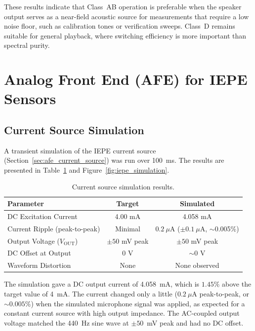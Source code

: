 These results indicate that Class~AB operation is preferable when the speaker output serves as a near-field acoustic source for measurements that require a low noise floor, such as calibration tones or verification sweeps. Class~D remains suitable for general playback, where switching efficiency is more important than spectral purity.


\section{Analog Front End (AFE) for IEPE Sensors}


\subsection{Current Source Simulation}
\label{sec:res_afe_current}
A transient simulation of the IEPE current source (Section~\ref{sec:afe_current_source}) was run over \SI{100}{\milli\second}. The results are presented in Table~\ref{tab:current_source_results} and Figure~\ref{fig:iepe_simulation}.

\begin{table}[h!]
\centering
\begin{tabular}{lcc}
\hline
\textbf{Parameter} & \textbf{Target} & \textbf{Simulated} \\
\hline
DC Excitation Current & 4.00 mA & 4.058 mA \\
Current Ripple (peak-to-peak) & Minimal & $0.2~\mu$A ($\pm 0.1~\mu$A, $\sim$0.005\%) \\
Output Voltage ($V_{\text{OUT}}$) & $\pm 50$ mV peak & $\pm 50$ mV peak \\
DC Offset at Output & 0 V & $\sim$0 V \\
Waveform Distortion & None & None observed \\
\hline
\end{tabular}
\caption{Current source simulation results.}
\label{tab:current_source_results}
\end{table}

The simulation gave a DC output current of \SI{4.058}{\milli\ampere}, which is $1.45\%$ above the target value of \SI{4}{\milli\ampere}. The current changed only a little ($0.2~\mu$A peak-to-peak, or $\sim 0.005\%$) when the simulated microphone signal was applied, as expected for a constant current source with high output impedance. The AC-coupled output voltage matched the \SI{440}{\hertz} sine wave at $\pm 50$~mV peak and had no DC offset.

